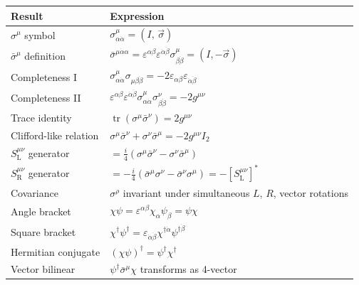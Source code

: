 \documentclass[12pt]{article}
\begin{document}
\begin{center}
\renewcommand{\arraystretch}{1.5}
\begin{tabular}{@{}p{5.5cm}p{8cm}@{}}
  \toprule
  Result & Expression \\
  \midrule
  $\sigma^\mu$ symbol & $\sigma^\mu_{\alpha\dot\alpha} = (I,\,\vec\sigma)$ \\[2pt]
  $\bar\sigma^\mu$ definition & $\bar\sigma^{\mu\dot\alpha\alpha}
    = \varepsilon^{\alpha\beta}\varepsilon^{\dot\alpha\dot\beta}\sigma^\mu_{\beta\dot\beta}
    = (I,-\vec\sigma)$ \quad [35.19] \\[2pt]
  Completeness I \quad [35.4] &
    $\sigma^\mu_{\alpha\dot\alpha}\sigma_{\mu\beta\dot\beta}
     = -2\varepsilon_{\alpha\beta}\varepsilon_{\dot\alpha\dot\beta}$ \\[2pt]
  Completeness II \quad [35.5] &
    $\varepsilon^{\alpha\beta}\varepsilon^{\dot\alpha\dot\beta}
     \sigma^\mu_{\alpha\dot\alpha}\sigma^\nu_{\beta\dot\beta} = -2g^{\mu\nu}$ \\[2pt]
  Trace identity &
    $\operatorname{tr}(\sigma^\mu\bar\sigma^\nu) = 2g^{\mu\nu}$ \\[2pt]
  Clifford-like relation &
    $\sigma^\mu\bar\sigma^\nu + \sigma^\nu\bar\sigma^\mu = -2g^{\mu\nu}I_2$ \\[2pt]
  $S^{\mu\nu}_{\mathrm{L}}$ generator \quad [35.21] &
    $= \tfrac{i}{4}(\sigma^\mu\bar\sigma^\nu - \sigma^\nu\bar\sigma^\mu)$ \\[2pt]
  $S^{\mu\nu}_{\mathrm{R}}$ generator \quad [35.22] &
    $= -\tfrac{i}{4}(\bar\sigma^\mu\sigma^\nu - \bar\sigma^\nu\sigma^\mu)
     = -[S^{\mu\nu}_{\mathrm{L}}]^*$ \\[2pt]
  Covariance \quad [35.14] &
    $\sigma^\rho$ invariant under simultaneous $L$, $R$, vector rotations \\[2pt]
  Angle bracket &
    $\chi\psi = \varepsilon^{\alpha\beta}\chi_\alpha\psi_\beta = \psi\chi$
    \quad [35.23, 35.25] \\[2pt]
  Square bracket &
    $\chi^\dagger\psi^\dagger
     = \varepsilon_{\dot\alpha\dot\beta}\chi^{\dagger\dot\alpha}\psi^{\dagger\dot\beta}$
    \quad [35.23] \\[2pt]
  Hermitian conjugate &
    $(\chi\psi)^\dagger = \psi^\dagger\chi^\dagger$ \quad [35.26] \\[2pt]
  Vector bilinear &
    $\psi^\dagger\bar\sigma^\mu\chi$ transforms as 4-vector \quad [35.28] \\[2pt]
  \bottomrule
\end{tabular}
\end{center}
\end{document}
